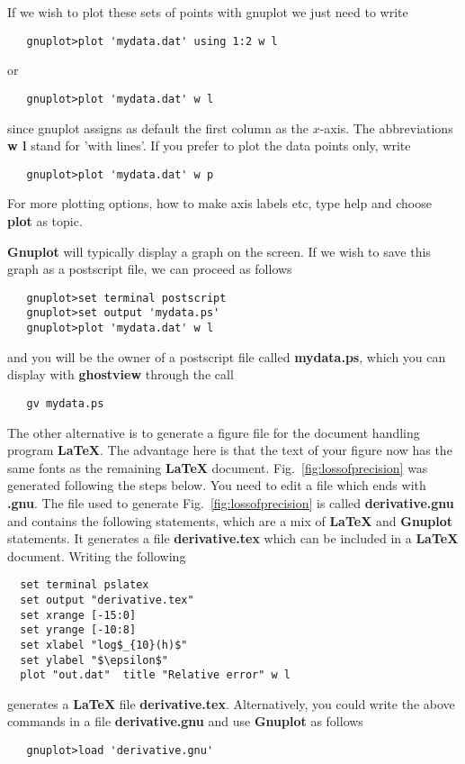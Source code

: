 If we wish to plot these sets of points with gnuplot we just need 
to write
\begin{verbatim}
   gnuplot>plot 'mydata.dat' using 1:2 w l
\end{verbatim}
or  
\begin{verbatim}
   gnuplot>plot 'mydata.dat' w l
\end{verbatim}
since gnuplot assigns as default the first column as the $x$-axis.
The abbreviations {\bf w l} stand for 'with lines'. If you prefer to plot
the data points only, write
\begin{verbatim}
   gnuplot>plot 'mydata.dat' w p
\end{verbatim}
For more plotting options, how to make axis labels etc, type help and choose
{\bf plot} as topic.

{\bf Gnuplot} will typically display a graph on the screen. If we wish to
save this graph as a postscript file, we can proceed as follows
\begin{verbatim}
   gnuplot>set terminal postscript
   gnuplot>set output 'mydata.ps'
   gnuplot>plot 'mydata.dat' w l
\end{verbatim}
and you will be the owner of a postscript file called 
{\bf mydata.ps}, which you can display with {\bf ghostview} through
the call
\begin{verbatim}
   gv mydata.ps
\end{verbatim}
 
The other alternative is to generate a figure file for the document handling
program {\bf \LaTeX}. 
The advantage here is that the text of your figure now has the same
fonts as the remaining {\bf \LaTeX} document.  
Fig.~\ref{fig:lossofprecision} was generated following the steps below.
You need to edit a file which ends with {\bf .gnu}. The file used
to generate Fig.~\ref{fig:lossofprecision} is called {\bf derivative.gnu}
and contains the following statements, which are a mix of
{\bf \LaTeX} and {\bf Gnuplot} statements. It generates a file 
{\bf derivative.tex}
which can be included in a {\bf \LaTeX} document.
Writing the following 
\begin{verbatim}
  set terminal pslatex
  set output "derivative.tex"
  set xrange [-15:0]
  set yrange [-10:8]
  set xlabel "log$_{10}(h)$"
  set ylabel "$\epsilon$"
  plot "out.dat"  title "Relative error" w l
\end{verbatim}
generates a {\bf \LaTeX} file {\bf derivative.tex}.
Alternatively, you could write the above commands in a file 
{\bf derivative.gnu} and use
{\bf Gnuplot} as follows
\begin{verbatim}
   gnuplot>load 'derivative.gnu'
\end{verbatim}

